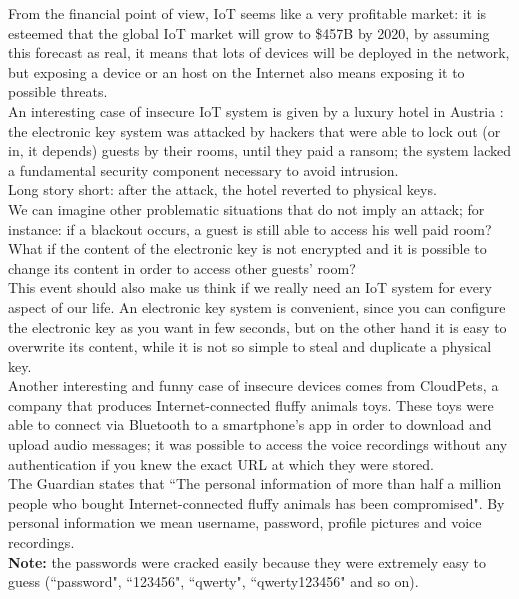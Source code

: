 \documentclass[12pt]{report}
\begin{document}
From the financial point of view, IoT seems like a very profitable market: it is esteemed that the global IoT market will grow to \$457B by 2020\cite{forbes}, by assuming this forecast as real, it means that lots of devices will be deployed in the network, but exposing a device
or an host on the Internet also means exposing it to possible threats.\\
An interesting case of insecure IoT system is given by a luxury hotel in Austria \cite{whydoiot}: the electronic key system was attacked
by hackers that were able to lock out (or in, it depends) guests by their rooms, until they paid a ransom; the system lacked a fundamental security
component necessary to avoid intrusion.\\
Long story short: after the attack, the hotel reverted to physical keys.\\
We can imagine other problematic situations that do not imply an attack; for instance: if a blackout occurs, a guest is still able to access his well paid room?\\
What if the content of the electronic key is not encrypted and it is possible to change its content in order to access other guests' room?\\
This event should also make us think if we really need an IoT system for every aspect of our life. An electronic key system is convenient, since you can configure the electronic key as you want in few seconds, but on the other hand it is easy to overwrite its content, while it is not so simple to steal and duplicate a physical key.\\

Another interesting and funny case of insecure devices comes from CloudPets\cite{toys}, a company that produces Internet-connected fluffy animals toys. These toys were able to connect via Bluetooth to a smartphone's app in order to download and upload audio messages; it was possible to access the voice recordings without any authentication if you knew the exact URL at which they were stored.\\
The Guardian states that ``The personal information of more than half a million people who bought Internet-connected fluffy animals has been compromised". By personal information we mean username, password, profile pictures and voice recordings.\\
\textbf{Note:} the passwords were cracked easily because they were extremely easy to guess (``password", ``123456", ``qwerty", ``qwerty123456" and so on).\\
\end{document}
